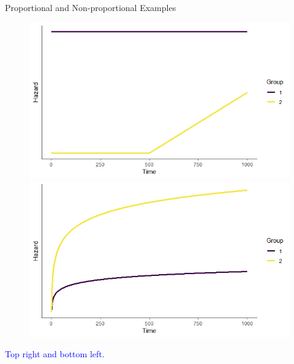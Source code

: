 \documentclass[10pt,t]{beamer}
\begin{document}
\begin{frame}{Proportional and Non-proportional Examples}
\begin{figure}
		
		\includegraphics[scale = 0.3]{figs/nonprop_hazard_1}
		\includegraphics[scale = 0.3]{figs/prop_hazard_2}
	\end{figure}\pause

\textcolor{blue}{Top right and bottom left.}
	
\end{frame}
\end{document}
